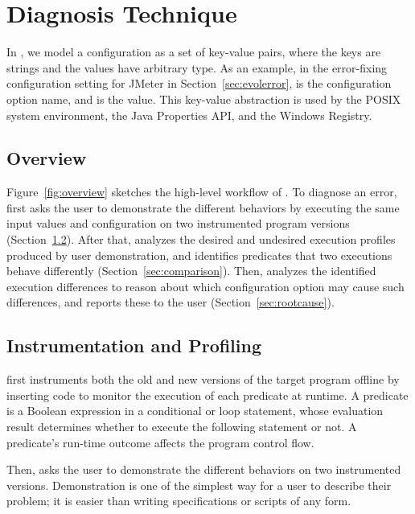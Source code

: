 
\section{Diagnosis Technique}
\label{sec:technique}

In \ourtool, we model a configuration as a set of key-value
pairs, where the keys are strings and the values have
arbitrary type. As an example, in the error-fixing
configuration setting  for JMeter in Section~\ref{sec:evolerror},
 is the configuration option name,
and  is the value. This key-value abstraction
is used by the POSIX system environment, the Java
Properties API, and the Windows Registry.

\subsection{Overview}

Figure~\ref{fig:overview} sketches the high-level workflow of
\ourtool. To diagnose an error, \ourtool first asks the user to demonstrate
the different behaviors by executing the same input values and
configuration on two instrumented program versions (Section~\ref{sec:profiling}). 
After that, \ourtool analyzes the desired and undesired
execution profiles produced by user demonstration, and identifies
predicates that two executions behave differently (Section~\ref{sec:comparison}).
Then, \ourtool analyzes the identified execution differences
to reason about which configuration option may cause such differences,
and reports these to the user (Section~\ref{sec:rootcause}).

\subsection{Instrumentation and Profiling}
\label{sec:profiling}

\ourtool first instruments both the old and new versions
of the target program offline by inserting code to monitor
the execution of each predicate at runtime. A predicate
is a Boolean expression in a conditional or loop statement,
whose evaluation result determines whether to execute the
following statement or not. A predicate's run-time outcome
affects the program control flow. 

Then, \ourtool asks the user to demonstrate the different
behaviors on two instrumented versions. Demonstration is
one of the simplest way for a user to describe their problem;
it is easier than writing specifications or scripts of any form.

